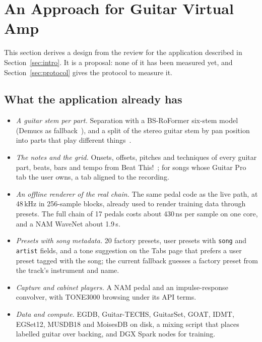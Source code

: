\section{An Approach for Guitar Virtual Amp}
\label{sec:application}

This section derives a design from the review for the application described
in Section~\ref{sec:intro}. It is a proposal: none of it has been measured
yet, and Section~\ref{sec:protocol} gives the protocol to measure it.

\subsection{What the application already has}

\begin{itemize}
\item \emph{A guitar stem per part.} Separation with a BS-RoFormer six-stem
model~\cite{lu2023bsroformer} (Demucs as fallback~\cite{rouard2023htdemucs}),
and a split of the stereo guitar stem by pan position into parts that play
different things~\cite{deangelo2026tabreview}.
\item \emph{The notes and the grid.} Onsets, offsets, pitches and techniques
of every guitar part, beats, bars and tempo from Beat This!~\cite{foscarin2024beatthis};
for songs whose Guitar Pro tab the user owns, a tab aligned to the recording.
\item \emph{An offline renderer of the real chain.} The same pedal code as the
live path, at 48\,kHz in 256-sample blocks, already used to render training
data through presets. The full chain of 17 pedals costs about 430\,ns per
sample on one core, and a NAM WaveNet about 1.9\,\textmu s.
\item \emph{Presets with song metadata.} 20 factory presets, user presets with
\texttt{song} and \texttt{artist} fields, and a tone suggestion on the Tabs
page that prefers a user preset tagged with the song; the current fallback
guesses a factory preset from the track's instrument and name.
\item \emph{Capture and cabinet players.} A NAM pedal and an impulse-response
convolver, with TONE3000 browsing under its API terms.
\item \emph{Data and compute.} EGDB, Guitar-TECHS, GuitarSet, GOAT, IDMT,
EGSet12, MUSDB18 and MoisesDB on disk, a mixing script that places labelled
guitar over backing, and DGX Spark nodes for training.
\end{itemize}


